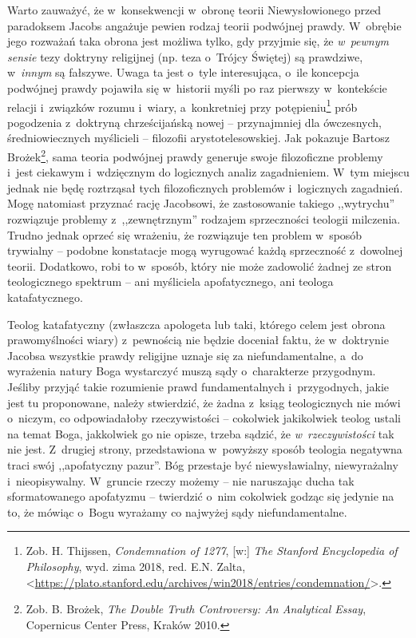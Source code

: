 Warto zauważyć, że w~konsekwencji w~obronę teorii Niewysłowionego przed paradoksem Jacobs angażuje pewien rodzaj teorii podwójnej prawdy. W~obrębie jego rozważań taka obrona jest możliwa tylko, gdy przyjmie się, że \textit{w~pewnym sensie} tezy doktryny religijnej (np. teza o~Trójcy Świętej) są prawdziwe, w~\textit{innym} są fałszywe. Uwaga ta jest o~tyle interesująca, o~ile koncepcja podwójnej prawdy pojawiła się w~historii myśli po raz pierwszy w~kontekście relacji i~związków rozumu i~wiary, a~konkretniej przy potępieniu\footnote{Zob. H. Thijssen, \textit{Condemnation of 1277}, [w:] \textit{The Stanford Encyclopedia of Philosophy}, wyd. zima 2018, red. E.N. Zalta, {\textless}\url{https://plato.stanford.edu/archives/win2018/entries/condemnation/}{\textgreater}.} prób pogodzenia z~doktryną chrześcijańską nowej -- przynajmniej dla ówczesnych, średniowiecznych myślicieli -- filozofii arystotelesowskiej. Jak pokazuje Bartosz Brożek\footnote{Zob. B. Brożek, \textit{The Double Truth Controversy: An Analytical Essay}, Copernicus Center Press, Kraków 2010.}, sama teoria podwójnej prawdy generuje swoje filozoficzne problemy i~jest ciekawym i~wdzięcznym do logicznych analiz zagadnieniem. W~tym miejscu jednak nie będę roztrząsał tych filozoficznych problemów i~logicznych zagadnień. Mogę natomiast przyznać rację Jacobsowi, że zastosowanie takiego ,,wytrychu'' rozwiązuje problemy z~,,zewnętrznym'' rodzajem sprzeczności teologii milczenia. Trudno jednak oprzeć się wrażeniu, że rozwiązuje ten problem w~sposób trywialny -- podobne konstatacje mogą wyrugować każdą sprzeczność z~dowolnej teorii. Dodatkowo, robi to w~sposób, który nie może zadowolić żadnej ze stron teologicznego spektrum -- ani myśliciela apofatycznego, ani teologa katafatycznego.

Teolog katafatyczny (zwłaszcza apologeta lub taki, którego celem jest obrona prawomyślności wiary) z~pewnością nie będzie doceniał faktu, że w~doktrynie Jacobsa wszystkie prawdy religijne uznaje się za niefundamentalne, a~do wyrażenia natury Boga wystarczyć muszą sądy o~charakterze przygodnym. Jeśliby przyjąć takie rozumienie prawd fundamentalnych i~przygodnych, jakie jest tu proponowane, należy stwierdzić, że żadna z~ksiąg teologicznych nie mówi o~niczym, co odpowiadałoby rzeczywistości -- cokolwiek jakikolwiek teolog ustali na temat Boga, jakkolwiek go nie opisze, trzeba sądzić, że \textit{w~rzeczywistości} tak nie jest. Z~drugiej strony, przedstawiona w~powyższy sposób teologia negatywna traci swój ,,apofatyczny pazur''. Bóg przestaje być niewysławialny, niewyrażalny i~nieopisywalny. W~gruncie rzeczy możemy -- nie naruszając ducha tak sformatowanego apofatyzmu -- twierdzić o~nim cokolwiek godząc się jedynie na to, że mówiąc o~Bogu wyrażamy co najwyżej sądy niefundamentalne.

